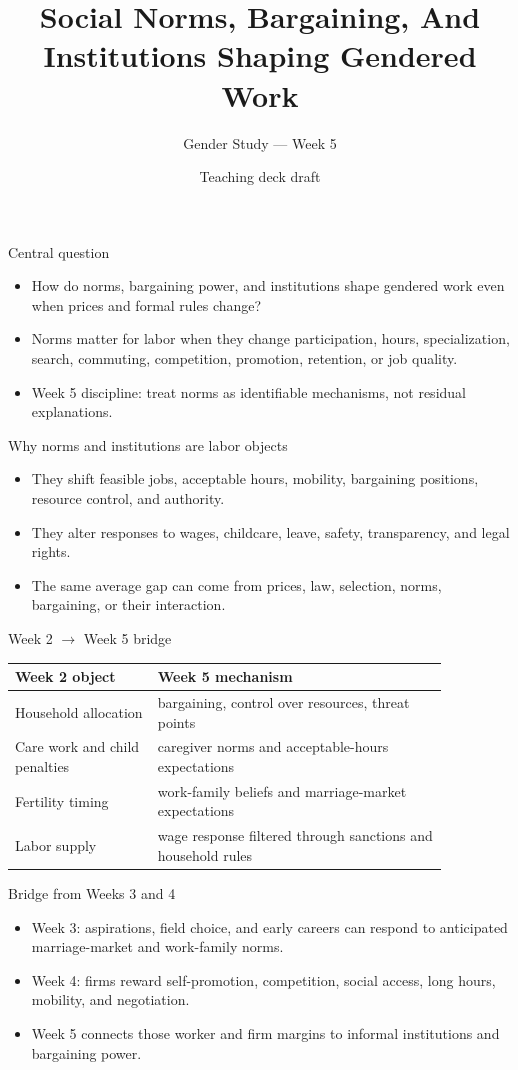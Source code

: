 \documentclass[aspectratio=169,11pt]{beamer}
\title{Social Norms, Bargaining, And Institutions Shaping Gendered Work}
\subtitle{Gender Study --- Week 5}
\author{Teaching deck draft}
\date{}
\begin{document}
\begin{frame}
  \titlepage
\end{frame}

\begin{frame}{Central question}
\begin{itemize}
    \item How do norms, bargaining power, and institutions shape gendered work even when prices and formal rules change?
    \item Norms matter for labor when they change participation, hours, specialization, search, commuting, competition, promotion, retention, or job quality.
    \item Week 5 discipline: treat norms as identifiable mechanisms, not residual explanations.
\end{itemize}
\end{frame}

\begin{frame}{Why norms and institutions are labor objects}
\begin{itemize}
    \item They shift feasible jobs, acceptable hours, mobility, bargaining positions, resource control, and authority.
    \item They alter responses to wages, childcare, leave, safety, transparency, and legal rights.
    \item The same average gap can come from prices, law, selection, norms, bargaining, or their interaction.
\end{itemize}
\end{frame}

\begin{frame}{Week 2 $\rightarrow$ Week 5 bridge}
\small
\begin{tabular}{p{0.28\linewidth} p{0.58\linewidth}}
\toprule
Week 2 object & Week 5 mechanism \\
\midrule
Household allocation & bargaining, control over resources, threat points \\
Care work and child penalties & caregiver norms and acceptable-hours expectations \\
Fertility timing & work-family beliefs and marriage-market expectations \\
Labor supply & wage response filtered through sanctions and household rules \\
\bottomrule
\end{tabular}
\end{frame}

\begin{frame}{Bridge from Weeks 3 and 4}
\begin{itemize}
    \item Week 3: aspirations, field choice, and early careers can respond to anticipated marriage-market and work-family norms.
    \item Week 4: firms reward self-promotion, competition, social access, long hours, mobility, and negotiation.
    \item Week 5 connects those worker and firm margins to informal institutions and bargaining power.
\end{itemize}
\end{frame}
\end{document}
